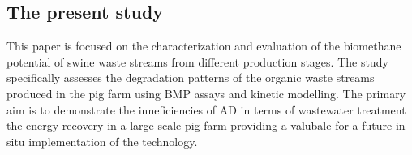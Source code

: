 \subsection{The present study}
This paper is focused on the characterization and evaluation of the biomethane potential of swine waste streams from different production stages. The study specifically assesses the degradation patterns of the organic waste streams produced in the pig farm using BMP assays and kinetic modelling. The primary aim is to demonstrate the inneficiencies of AD in terms of wastewater treatment the energy recovery in a large scale pig farm providing a valubale  for a future in situ implementation of the technology.
